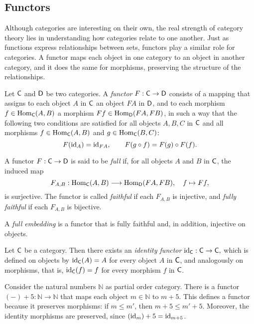 \subsection{Functors}
  

Although categories are interesting on their own, the real strength of category theory lies in understanding how categories relate to one another. Just as functions express relationships between sets, functors play a similar role for categories. A functor maps each object in one category to an object in another category, and it does the same for morphisms, preserving the structure of the relationships.

\begin{definition}
  Let $\mathsf{C}$ and $\mathsf{D}$ be two categories. A \emph{functor} $F: \mathsf{C} \to \mathsf{D}$ consists of a mapping that assigns to each object $A$ in $\mathsf{C}$ an object $FA$ in $\mathsf{D}$, and to each morphism $f \in \mathrm{Hom}_{\mathsf{C}}(A, B)$ a morphism $Ff \in \mathrm{Hom}_{\mathsf{D}}(FA, FB)$, in such a way that the following two conditions are satisfied for all objects $A, B, C$ in $\mathsf{C}$ and all morphisms $f \in \mathrm{Hom}_{\mathsf{C}}(A,B)$ and $g \in \mathrm{Hom}_{\mathsf{C}}(B,C)$:
\[
F(\mathrm{id}_A) = \mathrm{id}_{FA}, \qquad F(g \circ f) = F(g) \circ F(f).
\]

A functor $F: \mathsf{C} \to \mathsf{D}$ is said to be \emph{full} if, for all objects $A$ and $B$ in $\mathsf{C}$, the induced map
\[
F_{A,B}: \mathrm{Hom}_{\mathsf{C}}(A, B) \longrightarrow \mathrm{Hom}_{\mathsf{D}}(FA, FB), \quad f \mapsto Ff,
\]
is surjective. The functor is called \emph{faithful} if each $F_{A,B}$ is injective, and \emph{fully faithful} if each $F_{A,B}$ is bijective.

A \emph{full embedding} is a functor that is fully faithful and, in addition, injective on objects.
\end{definition}

\begin {example}
Let $\mathsf{C}$ be a category. Then there exists an \emph{identity functor} $\mathrm{id}_{\mathsf{C}} : \mathsf{C} \to \mathsf{C},$
which is defined on objects by $\mathrm{id}_{\mathsf{C}}(A) = A$ for every object $A$ in $\mathsf{C}$, and analogously on morphisms, that is, $\mathrm{id}_{\mathsf{C}}(f) = f$ for every morphism $f$ in $\mathsf{C}$.
\end{example}

\begin{example}
  Consider the natural numbers $\mathbb{N}$ as partial order category. There is a functor $(-) + 5 : \mathbb{N} \to \mathbb{N}$
that maps each object $m \in \mathbb{N}$ to $m + 5$. This defines a functor because it preserves morphisms: if $m \leq m'$, then $m + 5 \leq m' + 5$. Moreover, the identity morphisms are preserved, since $(\mathrm{id}_m) + 5 = \mathrm{id}_{m+5}$.
\end{example}

